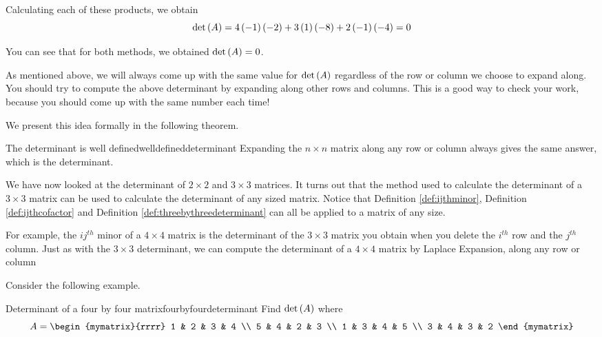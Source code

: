\begin{solution}
Calculating each of these products, we obtain
\begin{equation*}
\det \left(A\right)
=
4\left(-1\right)\left(-2\right) 
+
3\left(1\right)\left(-8\right) 
+
2 \left(-1\right)\left(-4\right)
=
0
\end{equation*}

You can see that for both methods, we obtained $\det \left(A\right) = 0$. 
\end{solution}

As mentioned above, we will always come up with the same value for $\det \left(A\right)$ regardless of the row or column 
we choose to expand along. You should try to compute the above determinant by expanding along other
rows and columns. This is a good way to check your work, because you should come up 
with the same number each time!  

We present this idea formally in the following theorem.

\begin{theorem}{The determinant is well defined}{welldefineddeterminant}
Expanding the $n\times n$ matrix along any row or column always gives the
same answer, which is the determinant.
\end{theorem}

We have now looked at the determinant of $2 \times 2$ and $3 \times 3$ matrices. It turns
out that the method used to calculate the determinant of a $3 \times 3$ matrix 
can be used to calculate the determinant of any sized matrix. Notice that
Definition \ref{def:ijthminor}, Definition \ref{def:ijthcofactor} and Definition \ref{def:threebythreedeterminant}
can all be applied to a matrix of any size. 

For example, the $ij^{th}$ minor of a $4 \times 4$ matrix is the determinant
of the $3 \times 3$ matrix you obtain when you delete the $i^{th}$ row and the $j^{th}$ column. 
Just as with the $3 \times 3$ determinant, we can compute the determinant of a $4 \times 4$ matrix by Laplace Expansion, 
along any row or column

Consider the following example. 

\begin{example}{Determinant of a four by four matrix}{fourbyfourdeterminant}
Find $\det \left(A\right) $ where
\begin{equation*}
A=\begin{mymatrix}{rrrr}
1 & 2 & 3 & 4 \\
5 & 4 & 2 & 3 \\
1 & 3 & 4 & 5 \\
3 & 4 & 3 & 2
\end{mymatrix}
\end{equation*}
\end{example}

